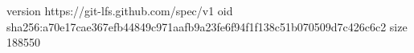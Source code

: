 version https://git-lfs.github.com/spec/v1
oid sha256:a70e17cae367efb44849c971aafb9a23fe6f94f1f138c51b070509d7c426c6c2
size 188550

